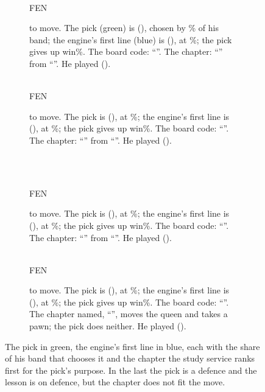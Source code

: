 \documentclass[11pt]{article}
\begin{document}
\begin{figure}[!ht]
\centering
\begin{subfigure}[t]{0.48\textwidth}
\centering
\EaBoard\\[0.4em]
{\footnotesize FEN \EaFen}
\caption{\EaSide{} to move. The pick (green) is \EaPick{} (\EaPickUci), chosen by \EaPShare\% of
his band; the engine's first line (blue) is \EaTop{} (\EaTopUci), at \EaTShare\%; the pick gives
up \EaLoss{} win\%. The board code: ``\EaSays''. The chapter: ``\EaIdea'' from ``\EaTitle''. He
played \EaPlayed{} (\EaPlayedUci).}
\label{fig:queens}
\end{subfigure}\hfill
\begin{subfigure}[t]{0.48\textwidth}
\centering
\EbBoard\\[0.4em]
{\footnotesize FEN \EbFen}
\caption{\EbSide{} to move. The pick is \EbPick{} (\EbPickUci), at \EbPShare\%; the engine's
first line is \EbTop{} (\EbTopUci), at \EbTShare\%; the pick gives up \EbLoss{} win\%. The board
code: ``\EbSays''. The chapter: ``\EbIdea'' from ``\EbTitle''. He played \EbPlayed{}
(\EbPlayedUci).}
\label{fig:piece}
\end{subfigure}\\[1em]
\begin{subfigure}[t]{0.48\textwidth}
\centering
\EcBoard\\[0.4em]
{\footnotesize FEN \EcFen}
\caption{\EcSide{} to move. The pick is \EcPick{} (\EcPickUci), at \EcPShare\%; the engine's
first line is \EcTop{} (\EcTopUci), at \EcTShare\%; the pick gives up \EcLoss{} win\%. The board
code: ``\EcSays''. The chapter: ``\EcIdea'' from ``\EcTitle''. He played \EcPlayed{}
(\EcPlayedUci).}
\label{fig:break}
\end{subfigure}\hfill
\begin{subfigure}[t]{0.48\textwidth}
\centering
\EdBoard\\[0.4em]
{\footnotesize FEN \EdFen}
\caption{\EdSide{} to move. The pick is \EdPick{} (\EdPickUci), at \EdPShare\%; the engine's
first line is \EdTop{} (\EdTopUci), at \EdTShare\%; the pick gives up \EdLoss{} win\%. The board
code: ``\EdSays''. The chapter named, ``\EdIdea'', moves the queen and takes a pawn; the pick
does neither. He played \EdPlayed{} (\EdPlayedUci).}
\label{fig:misfit}
\end{subfigure}
\caption{The pick in green, the engine's first line in blue, each with the share of his band
that chooses it and the chapter the study service ranks first for the pick's purpose. In the
last the pick is a defence and the lesson is on defence, but the chapter does not fit the move.}
\label{fig:examples}
\end{figure}
\end{document}
